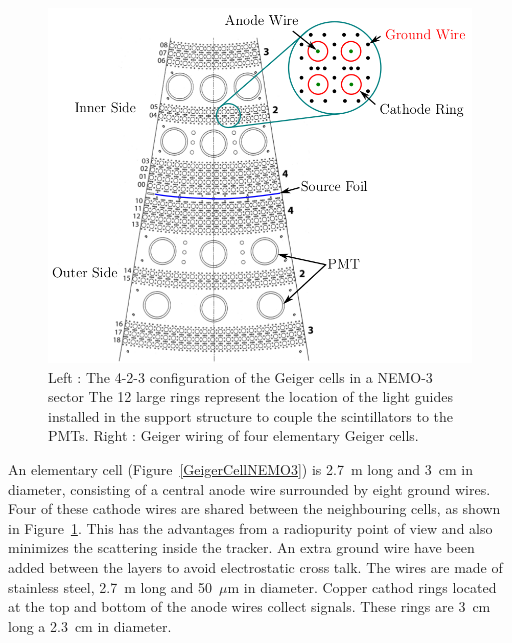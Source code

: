 \documentclass[main.tex]{subfiles}
\begin{document}
\bigskip


\begin{figure}[h!]
\begin{center}
\includegraphics[scale=0.30]{pictures/Chap3/TrackerNEMOview.png}
\caption{Left : The 4-2-3 configuration of the Geiger cells in a NEMO-3 sector The 12 large rings represent the location of the light guides installed in the support structure to couple the scintillators to the PMTs. Right : Geiger
wiring of four elementary Geiger cells.}
\label{TrackerNEMOView}
\end{center}
\end{figure}


\NI An elementary cell (Figure~\ref{GeigerCellNEMO3}) is 2.7~m long and 3~cm in diameter, consisting of a central anode wire surrounded by eight ground wires. Four of these cathode wires are shared between the neighbouring cells, as shown in Figure~\ref{TrackerNEMOView}. This has the advantages from a radiopurity point of view and also minimizes the scattering inside the tracker. An extra ground wire have been added between the layers to avoid electrostatic cross talk. The wires are made of stainless steel, 2.7~m long and 50~$\mu$m in diameter. Copper cathod rings located at the top and bottom of the anode wires collect signals. These rings are 3~cm long a 2.3~cm in diameter.


\bigskip
\end{document}
